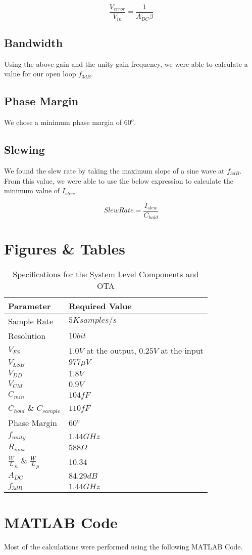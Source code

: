 \documentclass{article}
\begin{document}
\begin{equation}
\frac{V_{error}}{V_{in}} = \frac{1}{A_{DC}\beta}
\end{equation}

\subsection{Bandwidth}
Using the above gain and the unity gain frequency, we were able to calculate a value for our open loop $f_{3dB}$.

\subsection{Phase Margin}
We chose a minimum phase margin of $60^o$.

\subsection{Slewing}
We found the slew rate by taking the maximum slope of a sine wave at $f_{3dB}$. From this value, we were able to use the below expression to calculate the minimum value of $I_{slew}$.

\begin{equation}
Slew Rate = \frac{I_{slew}}{C_{hold}}
\end{equation}

\section{Figures \& Tables}

\begin{table}[h]
\centering
{}
\begin{tabularx}{500pt}{|R|R|}
\hline
\textbf{Parameter}&\textbf{Required Value}\\ \hline
Sample Rate&$5K samples/s$\\ \hline
Resolution&$10bit$\\ \hline
$V_{FS}$&$1.0V$ at the output, $0.25V$ at the input\\ \hline
$V_{LSB}$&$977\mu V$\\ \hline
$V_{DD}$&$1.8V$\\ \hline
$V_{CM}$&$0.9V$\\ \hline
$C_{min}$&$104fF$\\ \hline
$C_{hold}$ \& $C_{sample}$&$110fF$\\ \hline
Phase Margin&$60^o$\\ \hline
$f_{unity}$&$1.44GHz$\\ \hline
$R_{max}$&$588 \Omega$\\ \hline
$\frac{W}{L}_n$ \& $\frac{W}{L}_p$&10.34\\ \hline
$A_{DC}$&$84.29dB$\\ \hline
$f_{3dB}$&$1.44GHz$\\ \hline
\end{tabularx}
\caption{Specifications for the System Level Components and OTA}
\label{specs}
\end{table}

\clearpage
\section{MATLAB Code}
Most of the calculations were performed using the following MATLAB Code.

\end{document}
